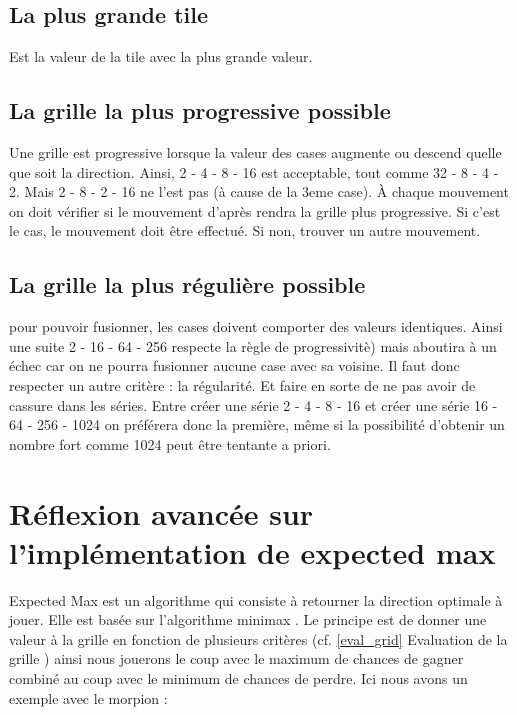\documentclass{article}
\begin{document}
	\subsection{La plus grande tile} 
	Est la valeur de la tile avec la plus grande valeur.

	\subsection{La grille la plus progressive possible}
	Une grille est progressive lorsque la valeur des cases augmente ou descend quelle que soit la direction. Ainsi, 2 - 4 - 8 - 16 est acceptable, tout comme 32 - 8 - 4 - 2. Mais 2 - 8 - 2 - 16 ne l'est pas (\`a cause de la 3eme case). \`A chaque mouvement on doit vérifier si  le mouvement d'apr\`es rendra la grille plus progressive. Si c'est le cas, le mouvement doit \^etre effectu\'e. Si non, trouver un autre mouvement.

	\subsection{La grille la plus réguli\`ere possible}
	pour pouvoir fusionner, les cases doivent comporter des valeurs identiques. Ainsi une suite 2 - 16 - 64 - 256 respecte la r\`egle de progressivit\`e) mais aboutira à un \'echec car on ne pourra fusionner aucune case avec sa voisine. Il faut donc respecter un autre crit\`ere : la r\'egularit\'e. Et faire en sorte de ne pas avoir de cassure dans les s\'eries. Entre cr\'eer une série 2 - 4 - 8 - 16 et cr\'eer une s\'erie 16 - 64 - 256 - 1024 on pr\'ef\'erera donc la premi\`ere, m\^eme si la possibilit\'e d'obtenir un nombre fort comme 1024 peut \^etre tentante a priori.

\clearpage
\section{Réflexion avanc\'ee sur l'implémentation de expected max}
\og Expected Max \fg{} est un algorithme qui consiste \`a retourner la direction optimale \`a jouer. Elle est bas\'ee sur l'algorithme \og minimax \fg{}. Le principe est de donner une valeur à la grille en fonction de plusieurs critères (cf. \og \ref{eval_grid} Evaluation de la grille \fg{}) ainsi nous jouerons le coup avec le maximum de chances de gagner combiné au coup avec le minimum de chances de perdre. Ici nous avons un exemple avec le morpion :
\end{document}

